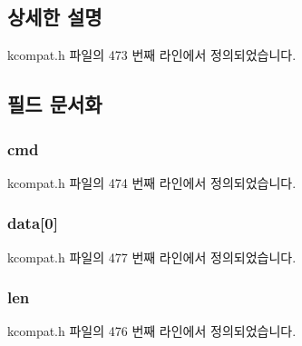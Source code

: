 \subsection{상세한 설명}


kcompat.\+h 파일의 473 번째 라인에서 정의되었습니다.



\subsection{필드 문서화}
\subsubsection[{\texorpdfstring{cmd}{cmd}}]{ cmd}\hypertarget{struct__kc__ethtool__regs_a62fe2a1dbf17d5a8561a5a7f5a97a9ba}{}\label{struct__kc__ethtool__regs_a62fe2a1dbf17d5a8561a5a7f5a97a9ba}


kcompat.\+h 파일의 474 번째 라인에서 정의되었습니다.

\subsubsection[{\texorpdfstring{data}{data}}]{ data\mbox{[}0\mbox{]}}\hypertarget{struct__kc__ethtool__regs_a2873fa0c210cc63894b6cbb14e1a1330}{}\label{struct__kc__ethtool__regs_a2873fa0c210cc63894b6cbb14e1a1330}


kcompat.\+h 파일의 477 번째 라인에서 정의되었습니다.

\subsubsection[{\texorpdfstring{len}{len}}]{ len}\hypertarget{struct__kc__ethtool__regs_a4105737bcbe35c1fd69996a085d8231a}{}\label{struct__kc__ethtool__regs_a4105737bcbe35c1fd69996a085d8231a}


kcompat.\+h 파일의 476 번째 라인에서 정의되었습니다.

